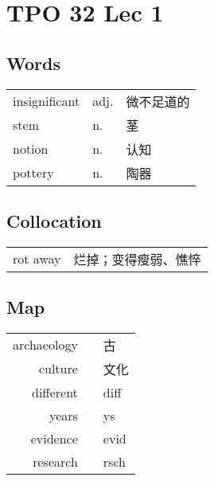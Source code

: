 \section{TPO 32 Lec 1}

\subsection{Words}

\begin{tabular}{lll}
    insignificant & adj. & 微不足道的 \\
    stem          & n.   & 茎     \\
    notion        & n.   & 认知    \\
    pottery       & n.   & 陶器    \\
\end{tabular}

\subsection{Collocation}

\begin{tabular}{ll}
    rot away & 烂掉；变得瘦弱、憔悴 \\
\end{tabular}

\subsection{Map}

\begin{tabular}{rc@{\quad$\to$\quad}l}
    archaeology &  & 古    \\
    culture     &  & 文化   \\
    different   &  & diff \\
    years       &  & ys   \\
    evidence    &  & evid \\
    research    &  & rsch \\
\end{tabular}
